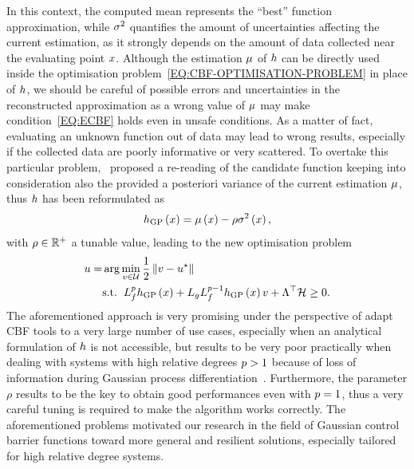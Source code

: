 In this context, the computed mean represents the ``best'' function approximation, while $\sigma^2$ quantifies the amount of uncertainties
affecting the current estimation, as it strongly depends on the amount of data collected near the evaluating point $x$.
Although the estimation $\mu$ of $h$ can be directly used inside the optimisation problem~\eqref{EQ:CBF-OPTIMISATION-PROBLEM}
in place of $h$, we should be careful of possible errors and uncertainties in the reconstructed approximation as a wrong value of
$\mu$ may make condition~\eqref{EQ:ECBF} holds even in unsafe conditions.
As a matter of fact, evaluating an unknown function out of data may lead to wrong results, especially if the collected data are
poorly informative or very scattered.
To overtake this particular problem,~\cite{khan2022gaussian} proposed a re-reading of the candidate function keeping into consideration
also the provided a posteriori variance of the current estimation $\mu$, thus $h$ has been reformulated as
\begin{equation*}
    h_{\text{GP}}\left( x \right) = \mu \left( x \right) - \rho \sigma^2 \left( x \right),
\end{equation*}
with $\rho \in \mathbb{R}^{+}$ a tunable value, leading to the new optimisation problem
\begin{equation*}
    \begin{split}
        u = & \arg \min_{v \in \mathcal{U}} \frac{1}{2} \left \lVert {v - u^{\star}} \right \rVert \\
        & \text{s.t.} \hspace*{0.2cm} L_{f}^{p} h_{\text{GP}}\left( x \right) +
                                      L_{g} L_{f}^{p-1} h_{\text{GP}} \left( x \right) v + \Lambda^{\top}\mathcal{H} \ge 0.
    \end{split}
\end{equation*}
The aforementioned approach is very promising under the perspective of adapt CBF tools to a very large number of use cases, especially
when an analytical formulation of $h$ is not accessible, but results to be very poor practically when dealing with systems with
high relative degrees $p > 1$ because of loss of information during Gaussian process differentiation~\cite{holsclaw2013gaussian}.
Furthermore, the parameter $\rho$ results to be the key to obtain good performances even with $p = 1$, thus a very careful tuning
is required to make the algorithm works correctly.
The aforementioned problems motivated our research in the field of Gaussian control barrier functions toward more general and resilient
solutions, especially tailored for high relative degree systems.

